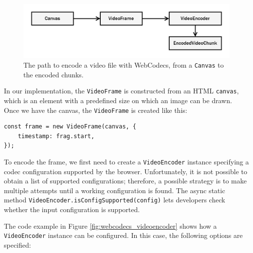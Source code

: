 \begin{figure}[h]
    \centering
    \includegraphics[width=\textwidth]{res/webcodecs.png}
    \caption{The path to encode a video file with WebCodecs, from a \texttt{Canvas} to the encoded chunks.}
    \label{fig:webcodecs_diagram}
\end{figure}

In our implementation, the \texttt{VideoFrame} is constructed from an HTML \texttt{canvas}, which is an element with a predefined size on which an image can be drawn. Once we have the canvas, the \texttt{VideoFrame} is created like this:

\begin{verbatim}
const frame = new VideoFrame(canvas, {
    timestamp: frag.start,
});
\end{verbatim}

To encode the frame, we first need to create a \texttt{VideoEncoder} instance specifying a codec configuration supported by the browser. Unfortunately, it is not possible to obtain a list of supported configurations; therefore, a possible strategy is to make multiple attempts until a working configuration is found. The async static method \texttt{VideoEncoder.isConfigSupported(config)} lets developers check whether the input configuration is supported.

The code example in Figure \ref{fig:webcodecs_videoencoder} shows how a \texttt{VideoEncoder} instance can be configured. In this case, the following options are specified:

